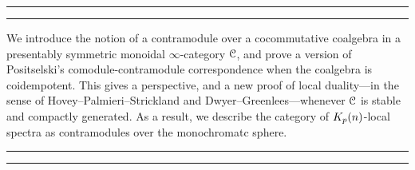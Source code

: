 

\vspace*{3cm}

{\par{}\par}
\vspace{-2em}
\rule[-11pt]{\textwidth}{1pt}
\rule{\textwidth}{0.5pt}
    
We introduce the notion of a contramodule over a cocommutative coalgebra in a presentably symmetric monoidal $\infty$-category $\EuScript{C}$, and prove a version of Positselski's comodule-contramodule correspondence when the coalgebra is coidempotent. This gives a perspective, and a new proof of local duality---in the sense of Hovey--Palmieri--Strickland and Dwyer--Greenlees---whenever $\EuScript{C}$ is stable and compactly generated. As a result, we describe the category of ${K_p(n)}$-local spectra as contramodules over the monochromatc sphere. 

\rule{\textwidth}{0.5pt}
\rule[11pt]{\textwidth}{1pt}

\vspace{\fill}




